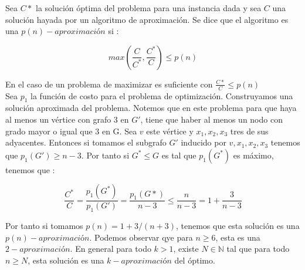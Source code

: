 \documentclass[
10pt, %
a4paper, %
oneside, %
headinclude,footinclude, %
BCOR5mm, %
]{scrartcl}
\begin{document}
Sea $C*$ la solución óptima del problema para una instancia dada y sea $C$ una solución hayada por un algoritmo de aproximación. Se dice que el algoritmo es una $p(n)-aproximación$ si :

$$
max (\frac{C}{C^*}, \frac{C^*}{C}) \leq p(n)
$$

En el caso de un problema de maximizar es suficiente con $\frac{C*}{C} \leq p(n)$ \\

Sea $p_1$ la función de costo para el problema de optimización. Construyamos una solución aproximada del problema. Notemos que en este problema para que haya al menos un vértice con grafo 3 en $G'$, tiene 
que haber al menos un nodo con grado mayor o igual que 3 en G. Sea $v$ este vértice y $x_1,x_2,x_3$ tres de sus adyacentes. Entonces si tomamos el subgrafo $G'$ inducido por ${v,x_1,x_2,x_3}$ tenemos que $p_1(G') \geq n-3$. Por tanto 
si $G^* \leq G$ es tal que $p_1(G^*)$ es máximo, tenemos que :

$$
\frac{C^*}{C} = \frac{p_1(G^*)}{p_1(G')} = \frac{p_1(G*)}{n-3} \leq \frac{n}{n-3} = 1 + \frac{3}{n-3}
$$

Por tanto si tomamos $p(n) = 1 + 3/(n+3)$, tenemos que esta solución es una $p(n)-aproximación$. Podemos observar qye para $n \geq 6$, esta es una $2-aproximación$. En general para todo $k > 1$, existe $N \in \mathbb{N}$ tal que para todo $n \geq N$, 
esta solución es una $k-aproximación$ del óptimo.



\renewcommand{\refname}{\spacedlowsmallcaps{References}} %




\end{document}
